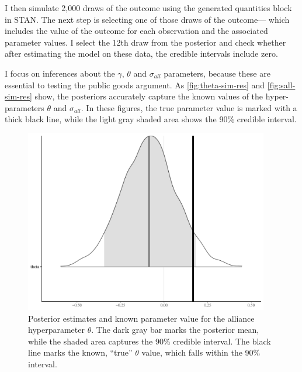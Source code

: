 \documentclass[12pt]{article}
\begin{document}
I then simulate 2,000 draws of the outcome using the generated quantities block in STAN. 
The next step is selecting one of those draws of the outcome--- which includes the value of the outcome for each observation and the associated parameter values. 
I select the 12th draw from the posterior and check whether after estimating the model on these data, the credible intervals include zero. 


I focus on inferences about the $\gamma$, $\theta$ and $\sigma_{all}$ parameters, because these are essential to testing the public goods argument. 
As \autoref{fig:theta-sim-res} and \autoref{fig:sall-sim-res} show, the posteriors accurately capture the known values of the hyper-parameters $\theta$ and $\sigma_{all}$. 
In these figures, the true parameter value is marked with a thick black line, while the light gray shaded area shows the 90\% credible interval. 


\begin{figure}[htbp]
	\centering
		\includegraphics[width=0.95\textwidth]{theta-sim-res.pdf}
	\caption{Posterior estimates and known parameter value for the alliance hyperparameter $\theta$. The dark gray bar marks the posterior mean, while the shaded area captures the 90\% credible interval. The black line marks the known, ``true'' $\theta$ value, which falls within the 90\% interval.}
	\label{fig:theta-sim-res}
\end{figure}
\end{document}
